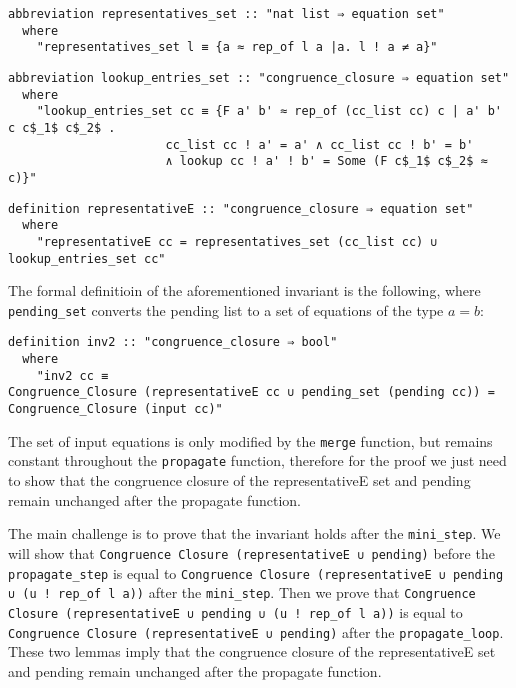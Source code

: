 \begin{lstlisting}
abbreviation representatives_set :: "nat list ⇒ equation set"
  where
    "representatives_set l ≡ {a ≈ rep_of l a |a. l ! a ≠ a}"
\end{lstlisting}

\begin{lstlisting}
abbreviation lookup_entries_set :: "congruence_closure ⇒ equation set"
  where
    "lookup_entries_set cc ≡ {F a' b' ≈ rep_of (cc_list cc) c | a' b' c c$_1$ c$_2$ .
                      cc_list cc ! a' = a' ∧ cc_list cc ! b' = b'
                      ∧ lookup cc ! a' ! b' = Some (F c$_1$ c$_2$ ≈ c)}"
\end{lstlisting}

\begin{lstlisting}
definition representativeE :: "congruence_closure ⇒ equation set"
  where
    "representativeE cc = representatives_set (cc_list cc) ∪ lookup_entries_set cc"
\end{lstlisting}

The formal definitioin of the aforementioned invariant is the following, where \lstinline{pending_set} converts the pending list to a set of equations of the type $a = b$:

\begin{lstlisting}
definition inv2 :: "congruence_closure ⇒ bool"
  where
    "inv2 cc ≡
Congruence_Closure (representativeE cc ∪ pending_set (pending cc)) = Congruence_Closure (input cc)"
\end{lstlisting}

The set of input equations is only modified by the \lstinline{merge} function, but remains constant throughout the \lstinline{propagate} function, therefore for the proof we just need to show that the congruence closure of the representativeE set and pending remain unchanged after the propagate function.

The main challenge is to prove that the invariant holds after the \lstinline{mini_step}. We will show that \lstinline{Congruence Closure (representativeE ∪ pending)} before the \lstinline{propagate_step} is equal to \lstinline{Congruence Closure (representativeE ∪ pending ∪ (u ! rep_of l a))} after the \lstinline{mini_step}.
Then we prove that \lstinline{Congruence Closure (representativeE ∪ pending ∪ (u ! rep_of l a))} is equal to \lstinline{Congruence Closure (representativeE ∪ pending)}  after the \lstinline{propagate_loop}.
These two lemmas imply that the congruence closure of the representativeE set and pending remain unchanged after the propagate function.

